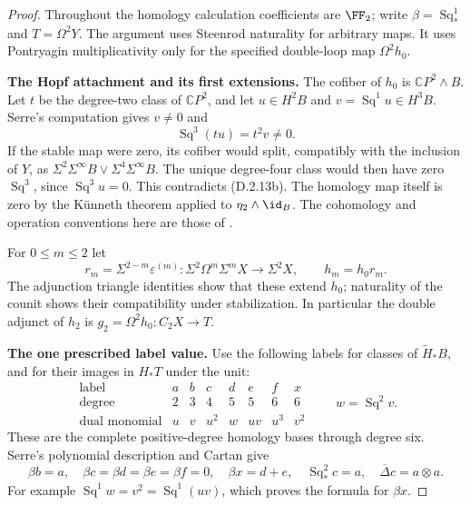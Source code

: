 \begin{proof}
Throughout the homology calculation coefficients are $\FF_2$;
write $\beta=\operatorname{Sq}_*^1$ and $T=\Omega^2Y$.
The argument uses Steenrod naturality for arbitrary maps. It uses
Pontryagin multiplicativity only for the specified double-loop map
$\Omega^2h_0$.

\medskip\noindent
\textbf{The Hopf attachment and its first extensions.}
The cofiber of $h_0$ is $\mathbb CP^2\wedge B$. Let $t$ be the
degree-two class of $\mathbb CP^2$, and let $u\in H^2B$ and
$v=\operatorname{Sq}^1u\in H^3B$. Serre's computation gives
$v\ne0$ and
\[
 \operatorname{Sq}^3(tu)=t^2v\ne0.
 \tag{D.2.13b}
\]
If the stable map were zero, its cofiber would split, compatibly with
the inclusion of $Y$, as $\Sigma^2\Sigma^\infty B\vee
\Sigma^4\Sigma^\infty B$. The unique degree-four class would then
have zero $\operatorname{Sq}^3$, since $\operatorname{Sq}^3u=0$.
This contradicts \textup{(D.2.13b)}. The homology map itself is zero
by the K\"unneth theorem applied to $\eta_2\wedge\id_B$.
The cohomology and operation conventions here are those of
\cite[\S1, nos.~2.1--2.4; \S2, nos.~8--9, pp.~199, 203--204]{I_Serre1953}.

For $0\le m\le2$ let
\[
 r_m=\Sigma^{2-m}\varepsilon^{(m)}:
 \Sigma^2\Omega^m\Sigma^mX\longrightarrow\Sigma^2X,
 \qquad h_m=h_0r_m.
 \tag{D.2.13c}
\]
The adjunction triangle identities show that these extend $h_0$;
naturality of the counit shows their compatibility under stabilization.
In particular the double adjunct of $h_2$ is
$g_2=\Omega^2h_0:C_2X\to T$.

\medskip\noindent
\textbf{The one prescribed label value.}
Use the following labels for classes of $\widetilde H_*B$, and for
their images in $H_*T$ under the unit:
\[
\begin{array}{c|rrrrrrr}
\text{label}&a&b&c&d&e&f&x\\
\text{degree}&2&3&4&5&5&6&6\\
\text{dual monomial}&u&v&u^2&w&uv&u^3&v^2
\end{array}
 \qquad w=\operatorname{Sq}^2v.
 \tag{D.2.13d}
\]
These are the complete positive-degree homology bases through degree
six. Serre's polynomial description and Cartan give
\[
 \beta b=a,\quad \beta c=\beta d=\beta e=\beta f=0,
 \quad\beta x=d+e,\quad \operatorname{Sq}_*^2c=a,
 \quad\overline\Delta c=a\otimes a.
 \tag{D.2.13e}
\]
For example $\operatorname{Sq}^1w=v^2=\operatorname{Sq}^1(uv)$,
which proves the formula for $\beta x$.


\end{proof}
